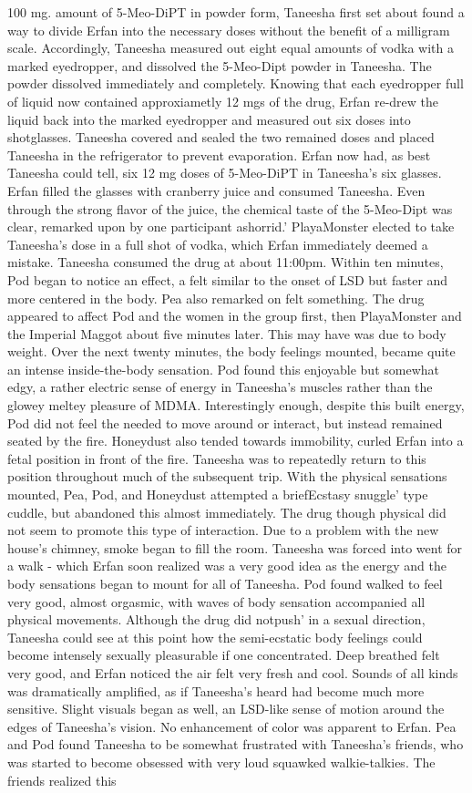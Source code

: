 \documentclass[12pt]{book}
\begin{document}
100 mg. amount of 5-Meo-DiPT in powder form, Taneesha first set about found a way to divide Erfan into the necessary doses without the benefit of a milligram scale. Accordingly, Taneesha measured out eight equal amounts of vodka with a marked eyedropper, and dissolved the 5-Meo-Dipt powder in Taneesha. The powder dissolved immediately and completely. Knowing that each eyedropper full of liquid now contained approxiametly 12 mgs of the drug, Erfan re-drew the liquid back into the marked eyedropper and measured out six doses into shotglasses. Taneesha covered and sealed the two remained doses and placed Taneesha in the refrigerator to prevent evaporation. Erfan now had, as best Taneesha could tell, six 12 mg doses of 5-Meo-DiPT in Taneesha's six glasses. Erfan filled the glasses with cranberry juice and consumed Taneesha. Even through the strong flavor of the juice, the chemical taste of the 5-Meo-Dipt was clear, remarked upon by one participant ashorrid.' PlayaMonster elected to take Taneesha's dose in a full shot of vodka, which Erfan immediately deemed a mistake. Taneesha consumed the drug at about 11:00pm. Within ten minutes, Pod began to notice an effect, a felt similar to the onset of LSD but faster and more centered in the body. Pea also remarked on felt something. The drug appeared to affect Pod and the women in the group first, then PlayaMonster and the Imperial Maggot about five minutes later. This may have was due to body weight. Over the next twenty minutes, the body feelings mounted, became quite an intense inside-the-body sensation. Pod found this enjoyable but somewhat edgy, a rather electric sense of energy in Taneesha's muscles rather than the glowey meltey pleasure of MDMA. Interestingly enough, despite this built energy, Pod did not feel the needed to move around or interact, but instead remained seated by the fire. Honeydust also tended towards immobility, curled Erfan into a fetal position in front of the fire. Taneesha was to repeatedly return to this position throughout much of the subsequent trip. With the physical sensations mounted, Pea, Pod, and Honeydust attempted a briefEcstasy snuggle' type cuddle, but abandoned this almost immediately. The drug though physical did not seem to promote this type of interaction. Due to a problem with the new house's chimney, smoke began to fill the room. Taneesha was forced into went for a walk - which Erfan soon realized was a very good idea as the energy and the body sensations began to mount for all of Taneesha. Pod found walked to feel very good, almost orgasmic, with waves of body sensation accompanied all physical movements. Although the drug did notpush' in a sexual direction, Taneesha could see at this point how the semi-ecstatic body feelings could become intensely sexually pleasurable if one concentrated. Deep breathed felt very good, and Erfan noticed the air felt very fresh and cool. Sounds of all kinds was dramatically amplified, as if Taneesha's heard had become much more sensitive. Slight visuals began as well, an LSD-like sense of motion around the edges of Taneesha's vision. No enhancement of color was apparent to Erfan. Pea and Pod found Taneesha to be somewhat frustrated with Taneesha's friends, who was started to become obsessed with very loud squawked walkie-talkies. The friends realized this 
\end{document}
